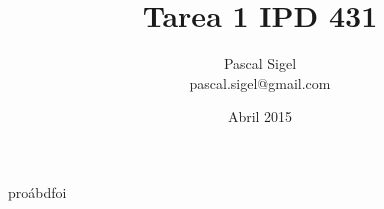 \documentclass[11pt,twoside,letterpaper]{article}
\begin{document}
	\title{Tarea 1 IPD 431}
	\author{Pascal Sigel\\pascal.sigel@gmail.com}
	\date{Abril 2015}
	\maketitle
	\newpage
	proábdfoi
\end{document}
